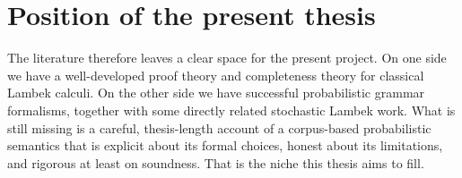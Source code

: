 \section{Position of the present thesis}
The literature therefore leaves a clear space for the present project. On one side we have a
well-developed proof theory and completeness theory for classical Lambek calculi. On the other
side we have successful probabilistic grammar formalisms, together with some directly related
stochastic Lambek work. What is still missing is a careful, thesis-length account of a
corpus-based probabilistic semantics that is explicit about its formal choices, honest about its
limitations, and rigorous at least on soundness. That is the niche this thesis aims to fill.

